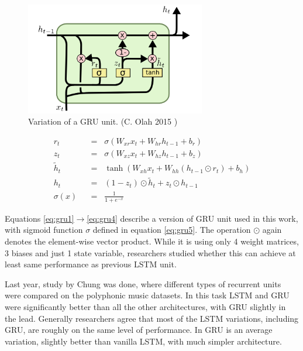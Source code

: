 \begin{figure}[!ht]
	\centering
	\includegraphics[width=0.7\textwidth]{./fig/LSTM3-var-GRU.png}
	\caption{Variation of a GRU unit. (C. Olah 2015 \cite{colah-lstm})
		\label{fig:gru}}
\end{figure}

\begin{align}
r_t \hspace{7pt}&=\hspace{7pt} \sigma(W_{xr}x_t + W_{hr}h_{t-1} + b_r) \label{eq:gru1}\\
z_t \hspace{7pt}&=\hspace{7pt} \sigma(W_{xz}x_t + W_{hz}h_{t-1} + b_z) \label{eq:gru2}\\
\widetilde{h}_t \hspace{7pt}&=\hspace{7pt} \tanh(W_{xh}x_t + W_{hh}(h_{t-1}\odot r_t) + b_h) \label{eq:gru3}\\
h_t \hspace{7pt}&=\hspace{7pt} (1-z_t)\odot \widetilde{h}_t + z_t\odot h_{t-1} \label{eq:gru4}\\[16pt]
\sigma(x) \hspace{7pt}&=\hspace{7pt} \frac{1}{1+e^{-x}} \label{eq:gru5}
\end{align}

Equations \eqref{eq:gru1}$ \rightarrow $\eqref{eq:gru4} describe a version of GRU unit used in this work, with sigmoid function $ \sigma $ defined in equation \eqref{eq:gru5}. The operation $ \odot $ again denotes the element-wise vector product. While it is using only 4 weight matrices, 3 biases and just 1 state variable, researchers studied whether this can achieve at least same performance as previous LSTM unit.

Last year, study by Chung \cite{DBLP:journals/corr/ChungGCB14} was done, where different types of recurrent units were compared on the polyphonic music datasets. In this task LSTM and GRU were significantly better than all the other architectures, with GRU slightly in the lead. Generally researchers agree that most of the LSTM variations, including GRU, are roughly on the same level of performance. In \cite{DBLP:journals/corr/GreffSKSS15} GRU is an average variation, slightly better than vanilla LSTM, with much simpler architecture.

